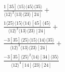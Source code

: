 \documentclass[varwidth, border=5pt]{standalone}
\begin{document}
\begin{my}
$\begin{gathered}
\scriptscriptstyle\frac{1[35]⟨15⟩⟨45⟩⟨35⟩}{⟨12⟩^2⟨13⟩⟨23⟩[24]}+\\
\scriptscriptstyle\frac{1⟨25⟩⟨15⟩⟨14⟩[45]⟨45⟩}{⟨12⟩^3⟨13⟩⟨23⟩[24]}+\\
\scriptscriptstyle\frac{-3[35]⟨25⟩⟨15⟩⟨14⟩⟨35⟩}{⟨12⟩^3⟨13⟩⟨23⟩[24]}+\\
\scriptscriptstyle\frac{-3[35]⟨25⟩^2⟨14⟩[34]⟨35⟩}{⟨12⟩^4[14]⟨23⟩[24]}\phantom{+}
\end{gathered}$
\end{my}
\end{document}
